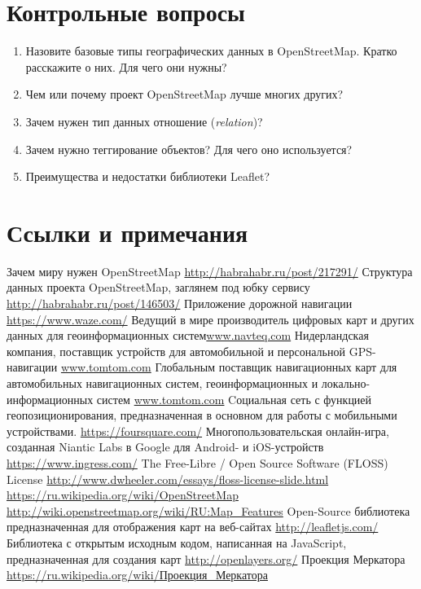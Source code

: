 \newpage

\section{Контрольные вопросы}
\begin{enumerate}
    \item Назовите базовые типы географических данных в OpenStreetMap. 
        Кратко расскажите о них. Для чего они нужны?
    \item Чем или почему проект OpenStreetMap лучше многих других?
    \item Зачем нужен тип данных отношение (\emph{relation})?
    \item Зачем нужно теггирование объектов? Для чего оно используется?
    \item Преимущества и недостатки библиотеки Leaflet?
\end{enumerate}

\newpage

\section{Ссылки и примечания}
\begin{thebibliography}{10}
     Зачем миру нужен OpenStreetMap 
        \url{http://habrahabr.ru/post/217291/}
     Структура данных проекта OpenStreetMap, заглянем под 
        юбку сервису \url{http://habrahabr.ru/post/146503/}
     Приложение дорожной навигации \url{https://www.waze.com/}
     Ведущий в мире производитель цифровых карт и других 
        данных для геоинформационных систем\url{www.navteq.com}
     Нидерландская компания, поставщик устройств для 
        автомобильной и персональной GPS-навигации \url{www.tomtom.com}
     Глобальным поставщик навигационных карт для 
        автомобильных навигационных систем, геоинформационных и 
        локально-информационных систем \url{www.tomtom.com}
     Cоциальная сеть с функцией геопозиционирования, 
        предназначенная в основном для работы с мобильными устройствами.
        \url{https://foursquare.com/}
     Многопользовательская онлайн-игра, созданная 
        Niantic Labs в Google для Android- и iOS-устройств 
        \url{https://www.ingress.com/}
     The Free-Libre / Open Source Software (FLOSS) License 
        \url{http://www.dwheeler.com/essays/floss-license-slide.html}
     \url{https://ru.wikipedia.org/wiki/OpenStreetMap}
     \url{http://wiki.openstreetmap.org/wiki/RU:Map_Features}
     Open-Source библиотека предназначенная для отображения 
        карт на веб-сайтах \url{http://leafletjs.com/}
     Библиотека с открытым исходным кодом, написанная на 
        JavaScript, предназначенная для создания карт 
        \url{http://openlayers.org/}
     Проекция Меркатора 
        \url{https://ru.wikipedia.org/wiki/Проекция_Меркатора}
\end{thebibliography}